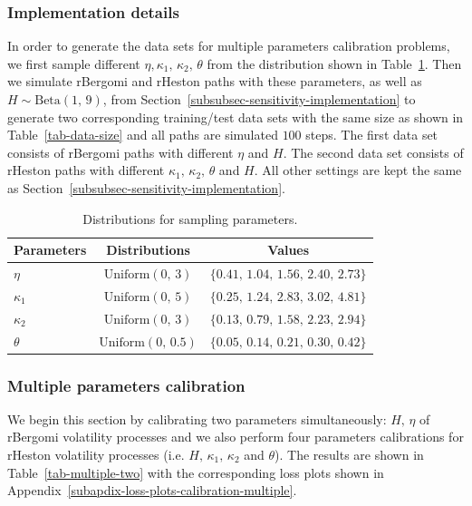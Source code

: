 \documentclass[]{article}
\renewcommand{\(}{\left(}
\renewcommand{\)}{\right)}
\begin{document}
	\subsubsection{Implementation details}
	\label{subsubsec-multiple-implementation}
	In order to generate the data sets for multiple parameters calibration problems, we first sample different $\eta,\kappa_1,\,\kappa_2,\,\theta$ from the distribution shown in Table~\ref{tab-multiple-distribution}. Then we simulate rBergomi and rHeston paths with these parameters, as well as $H\sim\text{Beta}(1,\,9)$, from Section~\ref{subsubsec-sensitivity-implementation} to generate two corresponding training/test data sets with the same size as shown in Table~\ref{tab-data-size} and all paths are simulated $100$ steps. The first data set consists of rBergomi paths with different $\eta$ and $H$. The second data set consists of rHeston paths with different $\kappa_1,\,\kappa_2,\,\theta$ and $H$. All other settings are kept the same as Section~\ref{subsubsec-sensitivity-implementation}.
	\begin{table}[H]
		\caption{Distributions for sampling parameters.}
		\label{tab-multiple-distribution}
		\smallskip
		\centering
		\renewcommand\arraystretch{1.5}
		\begin{tabular}{l c c}
			\toprule
			Parameters&Distributions&Values\\
			\hline
			$\eta$&$\text{Uniform}(0,\,3)$&$\{0.41,\,1.04,\,1.56,\,2.40,\,2.73\}$\\
			$\kappa_1$&$\text{Uniform}(0,\,5)$&$\{0.25,\,1.24,\,2.83,\,3.02,\,4.81\}$\\
			$\kappa_2$&$\text{Uniform}(0,\,3)$&$\{0.13,\,0.79,\,1.58,\,2.23,\,2.94\}$\\
			$\theta$&$\text{Uniform}(0,\,0.5)$&$\{0.05,\,0.14,\,0.21,\,0.30,\,0.42\}$\\
			\bottomrule
		\end{tabular}
	\end{table}
	
	\subsubsection{Multiple parameters calibration}
	\label{subsubsec-multiple-calibration}
	We begin this section by calibrating two parameters simultaneously: $H,\,\eta$ of rBergomi volatility processes and we also perform four parameters calibrations for rHeston volatility processes (i.e. $H,\,\kappa_1,\,\kappa_2$ and $\theta$). The results are shown in Table~\ref{tab-multiple-two} with the corresponding loss plots shown in Appendix~\ref{subapdix-loss-plots-calibration-multiple}.
	
\end{document}

